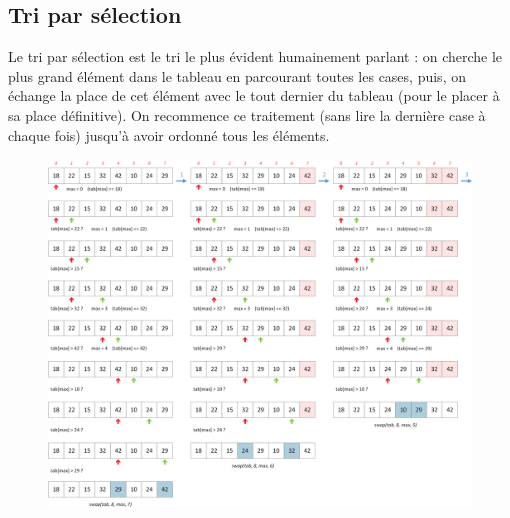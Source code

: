 \documentclass[11pt,a4paper]{article}
\begin{document}
\bigskip


\vfillLast

\clearpage


\subsection{Tri par sélection}

\medskip

Le tri par sélection est le tri le plus évident humainement parlant : on cherche le plus grand élément dans le tableau en parcourant toutes les cases, puis, on échange la place de cet élément avec le tout dernier du tableau (pour le placer à sa place définitive).
On recommence ce traitement (sans lire la dernière case à chaque fois) jusqu'à avoir ordonné tous les éléments.

\vfillFirst

\begin{figure}[ht!]
\centering
\centerline{
\includegraphics[width=1.2\textwidth]{img/SelectionSort_part1.png}
}
\end{figure}
\end{document}
